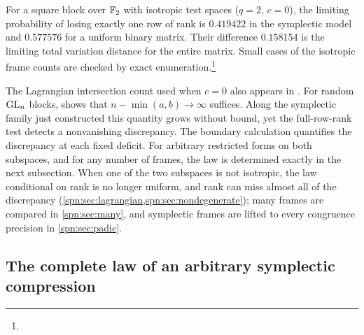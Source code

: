 \begin{example}\label{spn:ex:symplectic-F2}
For a square block over $\mathbb{F}_2$ with isotropic test spaces ($q=2$, $c=0$), the
limiting probability of losing exactly one row of rank is $0.419422$ in the
symplectic model and $0.577576$ for a uniform binary matrix. Their difference
$0.158154$ is the limiting total variation distance for the entire matrix.
Small cases of the isotropic frame counts are checked by exact
enumeration.\footnote{}
\end{example}

The Lagrangian intersection count used when $c=0$ also appears in
\cite[Corollary~2]{Kueng2015Qubit}. For random $\operatorname{GL}_n$ blocks,
\cite[Theorem~1.8]{Gorodetsky2026Statistics} shows that
$n-\min(a,b)\to\infty$ suffices. Along the symplectic family just constructed
this quantity grows without bound, yet the full-row-rank test detects a
nonvanishing discrepancy. The boundary calculation quantifies the discrepancy
at each fixed deficit. For arbitrary restricted forms on both subspaces, and
for any number of frames, the law is determined exactly in the next
subsection. When one of the two subspaces is not isotropic, the law
conditional on rank is no longer uniform, and rank can miss almost all of the
discrepancy (\cref{spn:sec:lagrangian,spn:sec:nondegenerate}); many frames are
compared in \cref{spn:sec:many}, and symplectic frames are lifted to every
congruence precision in \cref{spn:sec:padic}.


\subsection{The complete law of an arbitrary symplectic compression}\label{spn:sec:complete-law}


